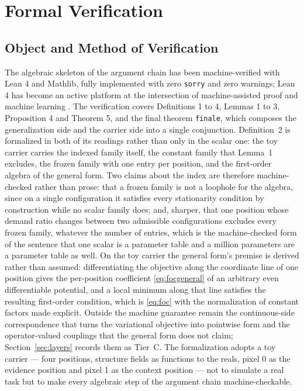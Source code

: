 \section{Formal Verification}
\label{ch:verify}

\subsection{Object and Method of Verification}

The algebraic skeleton of the argument chain has been machine-verified with Lean 4 and Mathlib, fully implemented with zero \texttt{sorry} and zero warnings; Lean 4 has become an active platform at the intersection of machine-assisted proof and machine learning \citep{yang2023}. The verification covers Definitions 1 to 4, Lemmas 1 to 3, Proposition 4 and Theorem 5, and the final theorem \texttt{finale}, which composes the generalization side and the carrier side into a single conjunction. Definition~2 is formalized in both of its readings rather than only in the scalar one: the toy carrier carries the indexed family itself, the constant family that Lemma~1 excludes, the frozen family with one entry per position, and the first-order algebra of the general form. Two claims about the index are therefore machine-checked rather than prose: that a frozen family is not a loophole for the algebra, since on a single configuration it satisfies every stationarity condition by construction while no scalar family does; and, sharper, that one position whose demand ratio changes between two admissible configurations excludes every frozen family, whatever the number of entries, which is the machine-checked form of the sentence that one scalar is a parameter table and a million parameters are a parameter table as well. On the toy carrier the general form's premise is derived rather than assumed: differentiating the objective along the coordinate line of one position gives the per-position coefficient \eqref{eq:focgeneral} of an arbitrary even differentiable potential, and a local minimum along that line satisfies the resulting first-order condition, which is \eqref{eq:foc} with the normalization of constant factors made explicit. Outside the machine guarantee remain the continuous-side correspondence that turns the variational objective into pointwise form and the operator-valued couplings that the general form does not claim; Section~\ref{sec:layers} records them as Tier~C. The formalization adopts a toy carrier --- four positions, structure fields as functions to the reals, pixel 0 as the evidence position and pixel 1 as the context position --- not to simulate a real task but to make every algebraic step of the argument chain machine-checkable.

